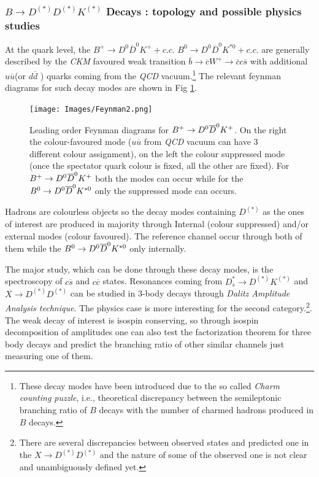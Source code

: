 \documentclass[paper=a4, fontsize=10pt]{scrartcl}
\numberwithin{equation}{section}		%
\numberwithin{figure}{section}			%
\numberwithin{table}{section}				%
\begin{document}
\subsubsection{${ B }\rightarrow { D }^{ (*)} { D }^{ (*) } { K }^{ (*) }$ Decays : topology and possible physics studies}

At the quark level, the  $B^{+}\rightarrow D^{0} \overline{D}^{0} K^{+} +c.c.$ 
$B^{0}\rightarrow D^{0} \overline{D}^{0} K^{\ast 0}  +  c.c.$ are generally described by the \textit{CKM} favoured weak transition $\overline{b} \rightarrow \overline{c} W^{+} \rightarrow \overline{c} c \overline{s}$ with additional $u\overline{u}$(or $d\overline{d} $ ) quarks coming from the \textit{QCD} vacuum.\footnote{These decay modes have been introduced due to the so called \textit{Charm counting puzzle}, i.e., theoretical discrepancy between the semileptonic branching ratio of $B$ decays with the number of charmed hadrons produced in $B$  decays.}  The relevant feynman diagrams for such decay modes are shown in Fig \ref{quarks}.
\begin{figure}[h!]
\begin{center}
\texttt{[image: Images/Feynman2.png]}
\caption{Leading order Feynman diagrams for $B^{+} \rightarrow D^0 \overline{D}^{0} K^{+}$. On the right the colour-favoured mode ($u\overline{u}$ from \textit{QCD} vacuum can have 3 different colour assignment), on the left the colour suppressed mode (once the spectator quark colour is fixed, all the other are fixed). For $B^{+} \rightarrow D^0 \overline{D}^{0} K^{+}$ both the modes can occur while for the $B^{0} \rightarrow D^0 \overline{D}^{0} K^{\ast 0}$ only the suppressed mode can occurs.}\label{quarks}
\end{center}
\end{figure}


Hadrons are colourless objects so the decay modes containing $D^{(\ast)}$ as the ones of interest are produced in majority through Internal (colour suppressed) and/or external modes (colour favoured). The reference channel occur through both of them while the $B^{0} \rightarrow D^0 \overline{D}^{0} K^{\ast 0}$ only internally.

The major study, which can be done through these decay modes, is the spectroscopy of $c\overline{s} $ and $c\overline{c}$ states. Resonances coming from  $D^{\ast}_{s} \rightarrow D^{(\ast)} K^{(\ast)}$ and  $X \rightarrow D^{(\ast)}D^{(\ast)}$ can be studied in 3-body decays through \textit{Dalitz Amplitude Analysis technique}. The physics case is more interesting for the second category.\footnote{ There are several discrepancies between observed states and predicted one in the $X \rightarrow D^{(\ast)}D^{(\ast)}$ and the nature of some of the observed one is not clear and unambiguously defined yet.}.
The weak decay of interest is isospin conserving, so through isospin decomposition of amplitudes one can also test the factorization theorem for three body decays and predict the branching ratio of other similar channels just measuring one of them.
\end{document}
